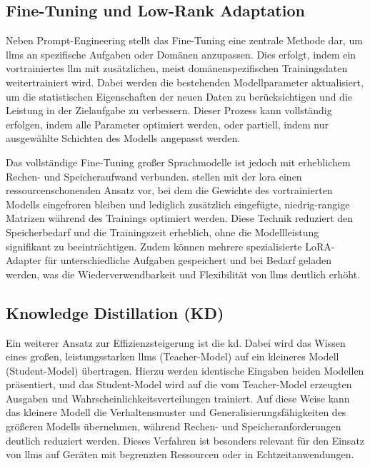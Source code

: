 
\subsection{Fine-Tuning und Low-Rank Adaptation}

Neben Prompt-Engineering stellt das Fine-Tuning eine zentrale Methode dar, um \glspl{llm} an spezifische Aufgaben oder Domänen anzupassen.
Dies erfolgt, indem ein vortrainiertes \gls{llm} mit zusätzlichen, meist domänenspezifischen Trainingsdaten weitertrainiert wird.
Dabei werden die bestehenden Modellparameter aktualisiert, um die statistischen Eigenschaften der neuen Daten zu berücksichtigen und die Leistung in der Zielaufgabe zu verbessern.
Dieser Prozess kann vollständig erfolgen, indem alle Parameter optimiert werden, oder partiell, indem nur ausgewählte Schichten des Modells angepasst werden\autocite{hu_lora_2021}.

Das vollständige Fine-Tuning großer Sprachmodelle ist jedoch mit erheblichem Rechen- und Speicheraufwand verbunden.
\citeauthor{hu_lora_2021} stellen mit der \gls{lora} einen ressourcenschonenden Ansatz vor, bei dem die Gewichte des vortrainierten Modells eingefroren bleiben und lediglich zusätzlich eingefügte, niedrig-rangige Matrizen während des Trainings optimiert werden\autocite{hu_lora_2021}.
Diese Technik reduziert den Speicherbedarf und die Trainingszeit erheblich, ohne die Modellleistung signifikant zu beeinträchtigen.
Zudem können mehrere spezialisierte LoRA-Adapter für unterschiedliche Aufgaben gespeichert und bei Bedarf geladen werden, was die Wiederverwendbarkeit und Flexibilität von \glspl{llm} deutlich erhöht.


\subsection{Knowledge Distillation (KD)}

Ein weiterer Ansatz zur Effizienzsteigerung ist die \gls{kd}.
Dabei wird das Wissen eines großen, leistungsstarken \glspl{llm} (Teacher-Model) auf ein kleineres Modell (Student-Model) übertragen.
Hierzu werden identische Eingaben beiden Modellen präsentiert, und das Student-Model wird auf die vom Teacher-Model erzeugten Ausgaben und Wahrscheinlichkeitsverteilungen trainiert.
Auf diese Weise kann das kleinere Modell die Verhaltensmuster und Generalisierungsfähigkeiten des größeren Modells übernehmen, während Rechen- und Speicheranforderungen deutlich reduziert werden.
Dieses Verfahren ist besonders relevant für den Einsatz von \glspl{llm} auf Geräten mit begrenzten Ressourcen oder in Echtzeitanwendungen\autocite{xu_survey_2024}.

